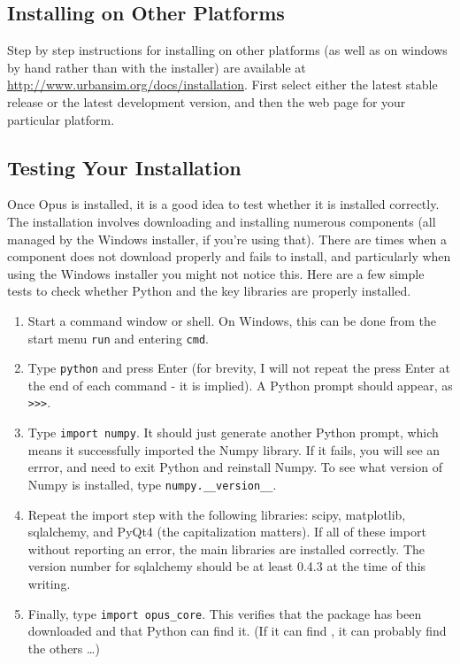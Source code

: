 \subsection{Installing on Other Platforms}

Step by step instructions for installing on other platforms (as well as on
windows by hand rather than with the installer) are available at
\url{http://www.urbansim.org/docs/installation}.  First select either the
latest stable release or the latest development version, and then the web
page for your particular platform.

\subsection{Testing Your Installation}
\label{sec:testing-your-installation}

Once Opus is installed, it is a good idea to test whether it is installed
correctly.  The installation involves downloading and installing numerous
components (all managed by the Windows installer, if you're using that).
There are times when a component does not download properly and fails to
install, and particularly when using the Windows installer you might not
notice this.  Here are a few simple tests to check whether Python and the
key libraries are properly installed.

\begin{enumerate}
\item Start a command window or shell.  On Windows, this can be done from
  the start menu \verb#run# and entering \verb#cmd#.
\item Type \verb#python# and press Enter (for brevity, I will not repeat
  the press Enter at the end of each command - it is implied).  A Python
  prompt should appear, as \verb#>>>#.
\item Type \verb#import numpy#.  It should just generate another Python
  prompt, which means it successfully imported the Numpy library.  If it
  fails, you will see an errror, and need to exit Python and reinstall
  Numpy.  To see what version of Numpy is installed, type
  \verb#numpy.__version__#.
\item Repeat the import step with the following libraries: scipy,
  matplotlib, sqlalchemy, and PyQt4 (the capitalization matters).  If all
  of these import without reporting an error, the main libraries are
  installed correctly.  The version number for sqlalchemy should be at
  least 0.4.3 at the time of this writing.
\item Finally, type \verb#import opus_core#.  This verifies that the
   package has been downloaded and that Python can find
  it.  (If it can find , it can probably find the others
  \ldots) 
\end{enumerate}

